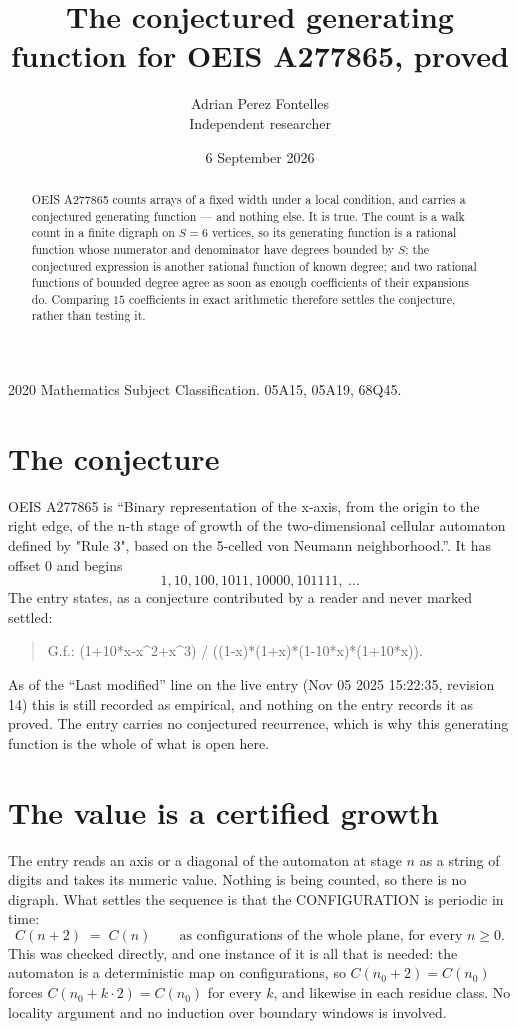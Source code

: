 \documentclass[11pt,a4paper]{article}
\title{The conjectured generating function for OEIS A277865, proved}
\author{Adrian Perez Fontelles\\ \small Independent researcher}
\date{6 September 2026}
\theoremstyle{plain}
\theoremstyle{definition}
\begin{document}
\maketitle

\begin{abstract}
OEIS A277865 counts arrays of a fixed width under a local condition, and carries a conjectured
generating function --- and nothing else. It is true. The count is a walk count in a finite
digraph on $S=6$ vertices, so its generating function is a rational function whose numerator
and denominator have degrees bounded by $S$; the conjectured expression is another rational
function of known degree; and two rational functions of bounded degree agree as soon as enough
coefficients of their expansions do. Comparing $15$ coefficients in exact arithmetic
therefore settles the conjecture, rather than testing it.
\end{abstract}

\noindent\small 2020 Mathematics Subject Classification. 05A15, 05A19, 68Q45.\normalsize

\section{The conjecture}

OEIS A277865 is ``Binary representation of the x-axis, from the origin to the right edge, of the n-th stage of growth of the two-dimensional cellular automaton defined by "Rule 3", based on the 5-celled von Neumann neighborhood.''. It has offset $0$ and begins
\[
1, 10, 100, 1011, 10000, 101111,\ \dots
\]
The entry states, as a conjecture contributed by a reader and never marked settled:
\begin{quote}
G.f.: (1+10*x-x\^{}2+x\^{}3) / ((1-x)*(1+x)*(1-10*x)*(1+10*x)).
\end{quote}
As of the ``Last modified'' line on the live entry (Nov 05 2025 15:22:35, revision 14) this is still
recorded as empirical, and nothing on the entry records it as proved. The entry carries no
conjectured recurrence, which is why this generating function is the whole of what is open
here.


\section{The value is a certified growth}

The entry reads an axis or a diagonal of the automaton at stage $n$ as a string of digits and
takes its numeric value. Nothing is being counted, so there is no digraph. What settles the
sequence is that the CONFIGURATION is periodic in time:
\[
C(n+2)\;=\;C(n)\qquad\text{as configurations of the whole plane, for every } n\ge 0.
\]
This was checked directly, and one instance of it is all that is needed: the automaton is a
deterministic map on configurations, so $C(n_0+2)=C(n_0)$ forces $C(n_0+k\cdot2)=C(n_0)$ for
every $k$, and likewise in each residue class. No locality argument and no induction over
boundary windows is involved.
\end{document}
